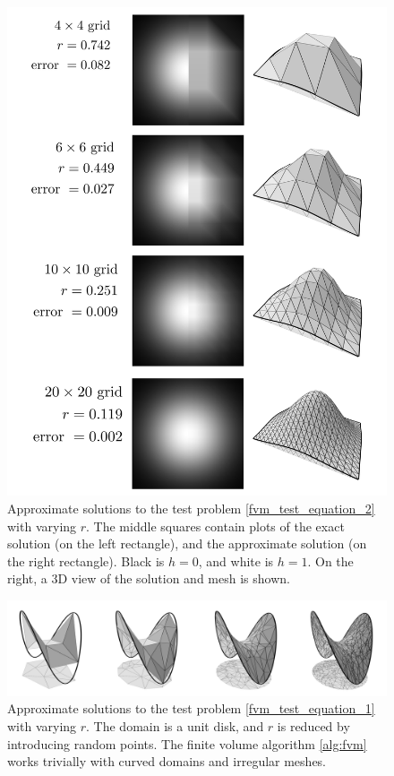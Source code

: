 \begin{figure}[H]
    \begin{center}
        \includegraphics[width=1\linewidth]{figures/error/error.png}
    \end{center}
    \caption{
        Approximate solutions to the test problem \eqref{fvm_test_equation_2} with varying $r$.
        The middle squares contain plots of the exact solution (on the left rectangle), and the approximate solution (on the right rectangle).
        Black is $h = 0$, and white is $h = 1$.
        On the right, a 3D view of the solution and mesh is shown.
    }
    \label{fvm_error_page}
\end{figure}


\begin{figure}[H]
    \begin{center}
        \includegraphics[width=1\linewidth]{figures/error/laplace_error.png}
    \end{center}
    \caption{
        Approximate solutions to the test problem \eqref{fvm_test_equation_1} with varying $r$.
        The domain is a unit disk, and $r$ is reduced by introducing random points. The finite volume algorithm \ref{alg:fvm}
        works trivially with curved domains and irregular meshes.
    }
    \label{fvm_laplace_error}
\end{figure}

